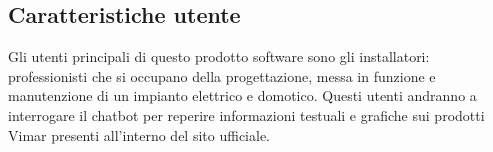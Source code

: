 \subsection{Caratteristiche utente}
Gli utenti principali di questo prodotto software sono gli installatori: professionisti che si occupano della progettazione, messa in funzione e manutenzione di un impianto elettrico e domotico. Questi utenti andranno a interrogare il chatbot per reperire informazioni testuali e grafiche sui prodotti Vimar presenti all'interno del sito ufficiale. 
